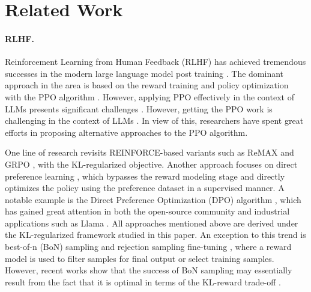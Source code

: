 \section{Related Work}
\paragraph{RLHF.} Reinforcement Learning from Human Feedback (RLHF) has achieved tremendous successes in the modern large language model post training \citep{OpenAI2023GPT4TR, bai2022training, ouyang2022training, team2023gemini}. The dominant approach in the area is based on the reward training and policy optimization with the PPO algorithm \citep{schulman2017proximal}. However, applying PPO effectively in the context of LLMs presents significant challenges \citep{choshen2019weaknesses}. However, getting the PPO work is challenging in the context of LLMs \citep{choshen2019weaknesses}. In view of this, researchers have spent great efforts in proposing alternative approaches to the PPO algorithm. 

One line of research revisits REINFORCE-based variants such as ReMAX and GRPO \citep{li2023remax, shao2024deepseekmath}, with the KL-regularized objective. Another approach focuses on direct preference learning \citep{zhao2023slic, rafailov2023direct, azar2023general}, which bypasses the reward modeling stage and directly optimizes the policy using the preference dataset in a supervised manner. A notable example is the Direct Preference Optimization (DPO) algorithm \citep{rafailov2023direct}, which has gained great attention in both the open-source community \citep{tunstall2023zephyr, lambert2024t} and industrial applications such as Llama \citep{dubey2024llama}. All approaches mentioned above are derived under the KL-regularized framework studied in this paper. An exception to this trend is best-of-n (BoN) sampling and rejection sampling fine-tuning \citep{bai2022training, dong2023raft, touvron2023llama}, where a reward model is used to filter samples for final output or select training samples. However, recent works show that the success of BoN sampling may essentially result from the fact that it is optimal in terms of the KL-reward trade-off \citep{gui2024bonbon, yang2024asymptotics}.


